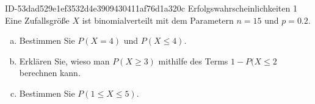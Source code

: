 \begin{exercise}
      {ID-53dad529e1ef3532d4e3909430411af76d1a320c}
      {Erfolgswahrscheinlichkeiten 1}
  \ifproblem\problem
    Eine Zufallsgröße $X$ ist binomialverteilt mit dem Parametern $n=15$ und
    $p=\num{0.2}$.
    \begin{enumerate}[a)]
      \item Bestimmen Sie $P(X=4)$ und $P(X\leq4)$.
      \item Erklären Sie, wieso man $P(X\geq3)$ mithilfe des Terms $1-P(X\leq2$
            berechnen kann.
      \item Bestimmen Sie $P(1\leq X\leq5)$.
    \end{enumerate}
  \fi
\end{exercise}
